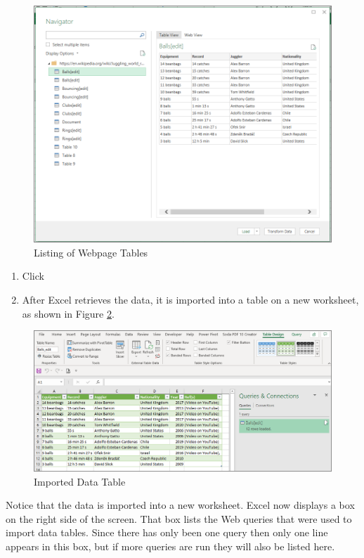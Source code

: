 \begin{figure}[H]
	\centering
	\includegraphics[width=\maxwidth{.95\linewidth}]{gfx/ch07_fig02b}
	\caption{Listing of Webpage Tables}
	\label{07:fig02b}
\end{figure}

\begin{enumerate}[resume]
	\item Click 
	\item After Excel retrieves the data, it is imported into a table on a new worksheet, as shown in Figure \ref{07:fig02c}.
\end{enumerate}

\begin{figure}[H]
	\centering
	\includegraphics[width=\maxwidth{.95\linewidth}]{gfx/ch07_fig02c}
	\caption{Imported Data Table}
	\label{07:fig02c}
\end{figure}

Notice that the data is imported into a new worksheet. Excel now displays a  box on the right side of the screen. That box lists the Web queries that were used to import data tables. Since there has only been one query then only one line appears in this box, but if more queries are run they will also be listed here. 

